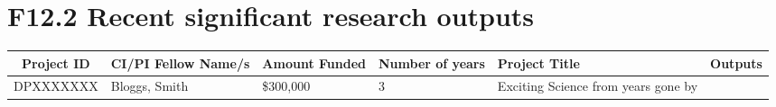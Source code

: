 \documentclass{arcpubs}
\begin{document}
\section*{F12.2 Recent significant research outputs}

\nocite{*}
\showbooks
\showchapters
\showarticles
\showproceedings

\begin{center}
\begin{tabularx}{\textwidth}{ |c|p{3cm}|p{2cm}|p{2cm}|X|p{2.5cm}| }
\hline
Project ID & CI/PI Fellow Name/s & Amount Funded & Number of years & Project Title & Outputs \\
\hline
DPXXXXXXX & Bloggs, Smith & \$300,000 & 3 & Exciting Science from years gone by & 
\cite{Jones2012} \\ %
\hline
\end{tabularx}
\end{center}
\end{document}
